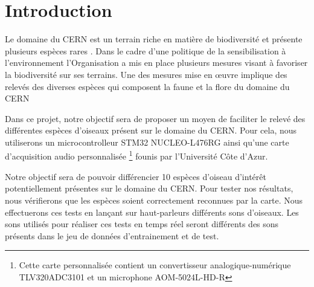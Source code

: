 \chapter{Introduction}

Le domaine du CERN est un terrain riche en matière de biodiversité et présente plusieurs espèces rares \cite{CernBiodiversity1}.
Dans le cadre d'une politique de la sensibilisation à l'environnement l'Organisation a mis en place plusieurs mesures
visant à favoriser la biodiversité sur ses terrains. 
Une des mesures mise en \oe{}uvre implique des relevés des diverses espèces 
qui composent la faune et la flore du domaine du CERN \cite{CernBiodiversity2}

Dans ce projet, notre objectif sera de proposer un moyen de faciliter le relevé des différentes espèces d'oiseaux
présent sur le domaine du CERN.
Pour cela, nous utiliserons un microcontrolleur STM32 NUCLEO-L476RG ainsi qu'une carte d'acquisition audio personnalisée 
\footnote{Cette carte personnalisée contient un convertisseur analogique-numérique TLV320ADC3101 et un microphone AOM-5024L-HD-R}
founis par l'Université Côte d'Azur. 

Notre objectif sera de pouvoir différencier 10 espèces d'oiseau d'intérêt potentiellement présentes sur le domaine du CERN.
Pour tester nos résultats, nous vérifierons que les espèces soient correctement reconnues par la carte. Nous effectuerons ces tests
en lançant sur haut-parleurs différents sons d'oiseaux. 
Les sons utilisés pour réaliser ces tests en temps réel seront différents des sons présents dans le jeu de données d'entrainement et de test.
